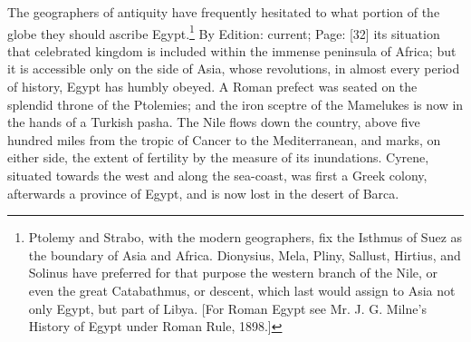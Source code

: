 The geographers of antiquity have frequently hesitated to what portion of the globe they should ascribe Egypt.\footnote{Ptolemy and Strabo, with the modern geographers, fix the Isthmus of Suez as the boundary of Asia and Africa. Dionysius, Mela, Pliny, Sallust, Hirtius, and Solinus have preferred for that purpose the western branch of the Nile, or even the great Catabathmus, or descent, which last would assign to Asia not only Egypt, but part of Libya. [For Roman Egypt see Mr. J. G. Milne\texthebrew{}’s History of Egypt under Roman Rule, 1898.]} By Edition: current; Page: [32] its situation that celebrated kingdom is included within the immense peninsula of Africa; but it is accessible only on the side of Asia, whose revolutions, in almost every period of history, Egypt has humbly obeyed. A Roman prefect was seated on the splendid throne of the Ptolemies; and the iron sceptre of the Mamelukes is now in the hands of a Turkish pasha. The Nile flows down the country, above five hundred miles from the tropic of Cancer to the Mediterranean, and marks, on either side, the extent of fertility by the measure of its inundations. Cyrene, situated towards the west and along the sea-coast, was first a Greek colony, afterwards a province of Egypt, and is now lost in the desert of Barca.


